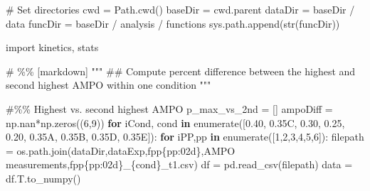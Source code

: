 \documentclass[
  11pt,
  a4paper]{article}
\newenvironment{Shaded}{\begin{snugshade}}{\end{snugshade}}
\newcommand{\BuiltInTok}[1]{\textcolor[rgb]{0.00,0.23,0.31}{#1}}
\newcommand{\CommentTok}[1]{\textcolor[rgb]{0.37,0.37,0.37}{#1}}
\newcommand{\ControlFlowTok}[1]{\textcolor[rgb]{0.00,0.23,0.31}{\textbf{#1}}}
\newcommand{\DecValTok}[1]{\textcolor[rgb]{0.68,0.00,0.00}{#1}}
\newcommand{\ImportTok}[1]{\textcolor[rgb]{0.00,0.46,0.62}{#1}}
\newcommand{\KeywordTok}[1]{\textcolor[rgb]{0.00,0.23,0.31}{\textbf{#1}}}
\newcommand{\NormalTok}[1]{\textcolor[rgb]{0.00,0.23,0.31}{#1}}
\newcommand{\OperatorTok}[1]{\textcolor[rgb]{0.37,0.37,0.37}{#1}}
\newcommand{\SpecialCharTok}[1]{\textcolor[rgb]{0.37,0.37,0.37}{#1}}
\newcommand{\SpecialStringTok}[1]{\textcolor[rgb]{0.13,0.47,0.30}{#1}}
\newcommand{\StringTok}[1]{\textcolor[rgb]{0.13,0.47,0.30}{#1}}
\begin{document}
\begin{Shaded}
\begin{Highlighting}[]
\CommentTok{\# Set directories}
\NormalTok{cwd }\OperatorTok{=}\NormalTok{ Path.cwd()}
\NormalTok{baseDir }\OperatorTok{=}\NormalTok{ cwd.parent}
\NormalTok{dataDir }\OperatorTok{=}\NormalTok{ baseDir }\OperatorTok{/} \StringTok{\textquotesingle{}data\textquotesingle{}}
\NormalTok{funcDir }\OperatorTok{=}\NormalTok{ baseDir }\OperatorTok{/} \StringTok{\textquotesingle{}analysis\textquotesingle{}} \OperatorTok{/} \StringTok{\textquotesingle{}functions\textquotesingle{}}
\NormalTok{sys.path.append(}\BuiltInTok{str}\NormalTok{(funcDir))}

\ImportTok{import}\NormalTok{ kinetics, stats}

\CommentTok{\# \%\% [markdown]}
\CommentTok{"""}
\CommentTok{\#\# Compute percent difference between the highest and second highest AMPO within one condition}
\CommentTok{"""}

\CommentTok{\#\%\% Highest vs. second highest AMPO}
\NormalTok{p\_max\_vs\_2nd }\OperatorTok{=}\NormalTok{ []}
\NormalTok{ampoDiff }\OperatorTok{=}\NormalTok{ np.nan}\OperatorTok{*}\NormalTok{np.zeros((}\DecValTok{6}\NormalTok{,}\DecValTok{9}\NormalTok{))}
\ControlFlowTok{for}\NormalTok{ iCond, cond }\KeywordTok{in} \BuiltInTok{enumerate}\NormalTok{([}\StringTok{\textquotesingle{}0.40\textquotesingle{}}\NormalTok{, }\StringTok{\textquotesingle{}0.35C\textquotesingle{}}\NormalTok{, }\StringTok{\textquotesingle{}0.30\textquotesingle{}}\NormalTok{, }\StringTok{\textquotesingle{}0.25\textquotesingle{}}\NormalTok{, }\StringTok{\textquotesingle{}0.20\textquotesingle{}}\NormalTok{, }\StringTok{\textquotesingle{}0.35A\textquotesingle{}}\NormalTok{, }\StringTok{\textquotesingle{}0.35B\textquotesingle{}}\NormalTok{, }\StringTok{\textquotesingle{}0.35D\textquotesingle{}}\NormalTok{, }\StringTok{\textquotesingle{}0.35E\textquotesingle{}}\NormalTok{]):}
    \ControlFlowTok{for}\NormalTok{ iPP,pp }\KeywordTok{in} \BuiltInTok{enumerate}\NormalTok{([}\DecValTok{1}\NormalTok{,}\DecValTok{2}\NormalTok{,}\DecValTok{3}\NormalTok{,}\DecValTok{4}\NormalTok{,}\DecValTok{5}\NormalTok{,}\DecValTok{6}\NormalTok{]):}
\NormalTok{        filepath }\OperatorTok{=}\NormalTok{ os.path.join(dataDir,}\StringTok{\textquotesingle{}dataExp\textquotesingle{}}\NormalTok{,}\SpecialStringTok{f\textquotesingle{}pp}\SpecialCharTok{\{}\NormalTok{pp}\SpecialCharTok{:02d\}}\SpecialStringTok{\textquotesingle{}}\NormalTok{,}\StringTok{\textquotesingle{}AMPO measurements\textquotesingle{}}\NormalTok{,}\SpecialStringTok{f\textquotesingle{}pp}\SpecialCharTok{\{}\NormalTok{pp}\SpecialCharTok{:02d\}}\SpecialStringTok{\_}\SpecialCharTok{\{}\NormalTok{cond}\SpecialCharTok{\}}\SpecialStringTok{\_t1.csv\textquotesingle{}}\NormalTok{)}
\NormalTok{        df }\OperatorTok{=}\NormalTok{ pd.read\_csv(filepath)}
\NormalTok{        data }\OperatorTok{=}\NormalTok{ df.T.to\_numpy()}
        

\end{Highlighting}
\end{Shaded}
\end{document}
